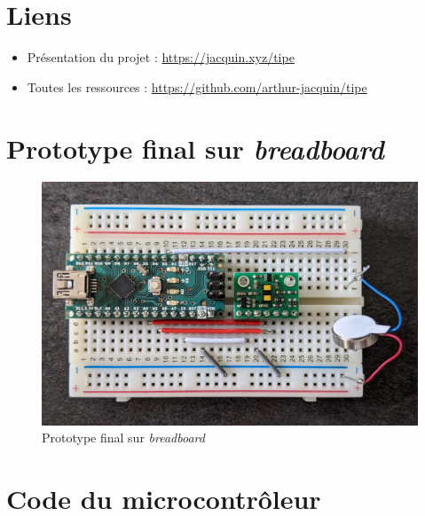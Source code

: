 \documentclass[a4paper, 11pt]{article}
\begin{document}

\appendix

\newpage

\section{Liens}
\begin{itemize}
\item Présentation du projet : \url{https://jacquin.xyz/tipe}
\item Toutes les ressources : \url{https://github.com/arthur-jacquin/tipe}
\end{itemize}

\section{Prototype final sur {\it breadboard}}
\begin{figure}[H]
\centering
\includegraphics[width=\textwidth]{images/prototype.jpg}
\caption{Prototype final sur {\it breadboard}}
\end{figure}

\section{Code du microcontrôleur}


\newpage
\end{document}
